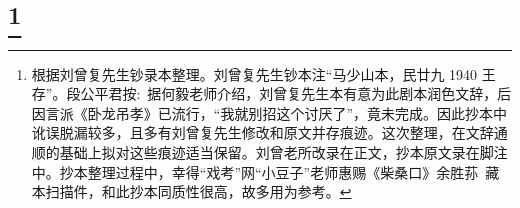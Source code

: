 \newpage
{} %
\section*{\large{}\protect\footnote{根据刘曾复先生钞录本整理。刘曾复先生钞本注``马少山本，民廿九 1940  王存''。段公平{\scriptsize 君}按:~据何毅老师介绍，刘曾复先生本有意为此剧本润色文辞，后因言派《卧龙吊孝》已流行，``我就别招这个讨厌了''，竟未完成。因此抄本中讹误脱漏较多，且多有刘曾复先生修改和原文并存痕迹。这次整理，在文辞通顺的基础上拟对这些痕迹适当保留。刘曾老所改录在正文，抄本原文录在脚注中。抄本整理过程中，幸得``戏考''网``小豆子''老师惠赐《柴桑口》余胜荪~藏本扫描件，和此抄本同质性很高，故多用为参考。}}

